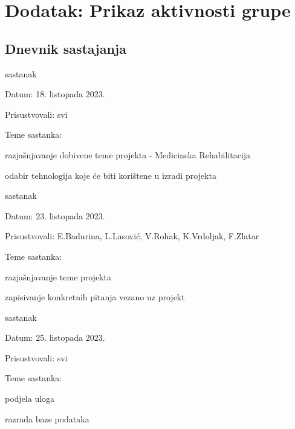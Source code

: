 \chapter*{Dodatak: Prikaz aktivnosti grupe}
		
		\section*{Dnevnik sastajanja}
		
		
		\begin{packed_enum}
			\item  sastanak			
			\item[] \begin{packed_item}
				\item Datum: 18. listopada 2023.
				\item Prisustvovali: svi
				\item Teme sastanka:
				\begin{packed_item}
					\item  razjašnjavanje dobivene teme projekta - Medicinska Rehabilitacija
					\item  odabir tehnologija koje će biti korištene u izradi projekta
				\end{packed_item}
			\end{packed_item}
			
			\item  sastanak
			\item[] \begin{packed_item}
				\item Datum: 23. listopada 2023.
				\item Prisustvovali: E.Badurina, L.Lasović, V.Rohak, K.Vrdoljak, F.Zlatar
				\item Teme sastanka:
				\begin{packed_item}
					\item  razjašnjavanje teme projekta
					\item  zapisivanje konkretnih pitanja vezano uz projekt
				\end{packed_item}
			\end{packed_item}
			
			\item  sastanak			
			\item[] \begin{packed_item}
				\item Datum: 25. listopada 2023.
				\item Prisustvovali: svi
				\item Teme sastanka:
				\begin{packed_item}
					\item  podjela uloga
					\item  razrada baze podataka
				\end{packed_item}
			\end{packed_item}
			

\end{packed_enum}
